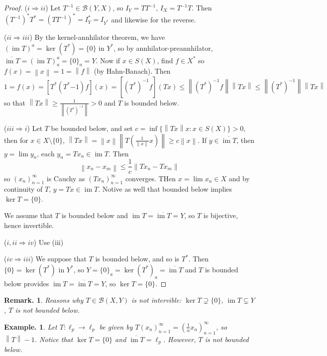 \documentclass[11pt, a4paper]{memoir}
\newcommand{\imp}[2]{($#1\Rightarrow#2$)\hspace{0.2cm}}
\newcommand{\norm}[1]{\ensuremath{\left\lVert#1\right\rVert}}
\theoremstyle{change}
\theoremstyle{plain}
\theoremstyle{nonumberplain}
\newtheorem{example}{Example.}
\newtheorem{remark}{Remark.}
\newtheorem{proof}{Proof}
\DeclareMathOperator{\im}{im}
\numberwithin{equation}{section}
\begin{document}
\begin{proof}
    \imp{i}{ii}
    Let $T^{-1}\in \mathcal{B}(Y,X)$, so $I_Y=TT^{-1}$, $I_X=T^{-1}T$.
    Then $(T^{-1})^*T^*=(TT^{-1})^*=I_Y^*=I_{Y^*}$ and likewise for the reverse.

    \imp{ii}{iii}
    By the kernel-annhilator theorem, we have $(\im T)^a=\ker(T^*)=\{0\}$ in $Y^*$, so by annhilator-preannhilator, $\overline{\im T}=(\im T)^a_a=\{0\}_a=Y$.
    Now if $x\in S(X)$, find $f\in X^*$ so $f(x)=\norm{x}=1=\norm{f}$ (by Hahn-Banach).
    Then
   \begin{equation*}
        1=f(x)=[T^*(T^*{-1})f](x)=[(T^*)^{-1}f](Tx)\leq\norm{(T^*)^{-1}f}\norm{Tx}\leq\norm{(T^*)^{-1}}\norm{Tx}
    \end{equation*}
    so that $\norm{Tx}\geq\frac{1}{\norm{(T^*)^{-1}}}>0$ and $T$ is bounded below.

    \imp{iii}{i}
    Let $T$ be bounded below, and set $c=\inf\{\norm{Tx}x:x\in S(X)\}>0$, then for $x\in X\setminus\{0\}$, $\norm{Tx}=\norm{x}\norm{T\left(\frac{1}{\norm{x}}x\right)}\geq c\norm{x}$.
    If $y\in\overline{\im T}$, then $y=\lim y_n$, each $y_n=Tx_n\in\im T$.
    Then
    \begin{equation*}
        \norm{x_n-x_m}\leq\frac{1}{c}\norm{Tx_n-Tx_m}
    \end{equation*}
    so $(x_n)_{n=1}^\infty$ is Cauchy as $(Tx_n)_{n=1}^\infty$ converges.
    THen $x=\lim x_n\in X$ and by continuity of $T$, $y=Tx\in\im T$.
    Notive as well that bounded below implies $\ker T=\{0\}$.

    We assume that $T$ is bounded below and $\im T=\overline{\im T}=Y$, so $T$ is bijective, hence invertible.

    \imp{i,ii}{iv}
    Use (iii)

    \imp{iv}{iii}
    We suppose that $T$ is bounded below, and so is $T^*$.
    Then $\{0\}=\ker(T^*)$ in $Y^*$, so $Y=\{0\}_a=\ker(T^*)_a=\overline{\im T}$ and $T$ is bounded below provides $\im T=\overline{\im T}=Y$, so $\ker T=\{0\}$.
\end{proof}
\begin{remark}
    Reasons why $T\in\mathcal{B}(X,Y)$ is not intervible: $\ker T\supsetneq\{0\}$, $\im T\subsetneq Y$, $T$ is not bounded below.
\end{remark}
\begin{example}
    Let $T:\ell_p\to\ell_p$ be given by $T(x_n)_{n=1}^\infty=\left(\frac{1}{n}x_n\right)_{n=1}^\infty$, so $\norm{T}-1$.
    Notice that $\ker T=\{0\}$ and $\overline{\im T}=\ell_p$.
    However, $T$ is not bounded below.
\end{example}
\end{document}
